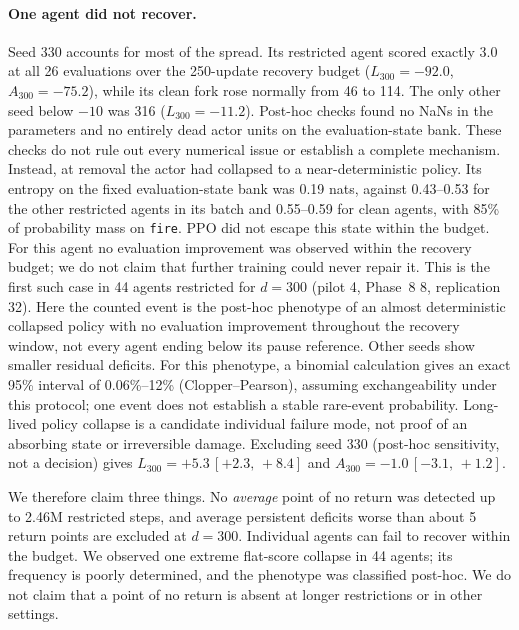 \documentclass[10pt]{article} %
\newcommand{\ci}[2]{\,[#1,\,#2]}
\begin{document}
\paragraph{One agent did not recover.} Seed 330 accounts for most of the spread. Its restricted agent scored exactly 3.0 at all 26 evaluations over the 250-update recovery budget ($L_{300}=-92.0$, $A_{300}=-75.2$), while its clean fork rose normally from 46 to 114. The only other seed below $-10$ was 316 ($L_{300}=-11.2$). Post-hoc checks found no NaNs in the parameters and no entirely dead actor units on the evaluation-state bank. These checks do not rule out every numerical issue or establish a complete mechanism. Instead, at removal the actor had collapsed to a near-deterministic policy. Its entropy on the fixed evaluation-state bank was 0.19 nats, against 0.43--0.53 for the other restricted agents in its batch and 0.55--0.59 for clean agents, with 85\% of probability mass on \texttt{fire}. PPO did not escape this state within the budget. For this agent no evaluation improvement was observed within the recovery budget; we do not claim that further training could never repair it. This is the first such case in 44 agents restricted for $d=300$ (pilot 4, Phase~8 8, replication 32). Here the counted event is the post-hoc phenotype of an almost deterministic collapsed policy with no evaluation improvement throughout the recovery window, not every agent ending below its pause reference. Other seeds show smaller residual deficits. For this phenotype, a binomial calculation gives an exact 95\% interval of 0.06\%--12\% (Clopper--Pearson), assuming exchangeability under this protocol; one event does not establish a stable rare-event probability. Long-lived policy collapse is a candidate individual failure mode, not proof of an absorbing state or irreversible damage. Excluding seed 330 (post-hoc sensitivity, not a decision) gives $L_{300}=+5.3\ci{+2.3}{+8.4}$ and $A_{300}=-1.0\ci{-3.1}{+1.2}$.

We therefore claim three things. No \emph{average} point of no return was detected up to 2.46M restricted steps, and average persistent deficits worse than about 5 return points are excluded at $d=300$. Individual agents can fail to recover within the budget. We observed one extreme flat-score collapse in 44 agents; its frequency is poorly determined, and the phenotype was classified post-hoc. We do not claim that a point of no return is absent at longer restrictions or in other settings.
\end{document}
